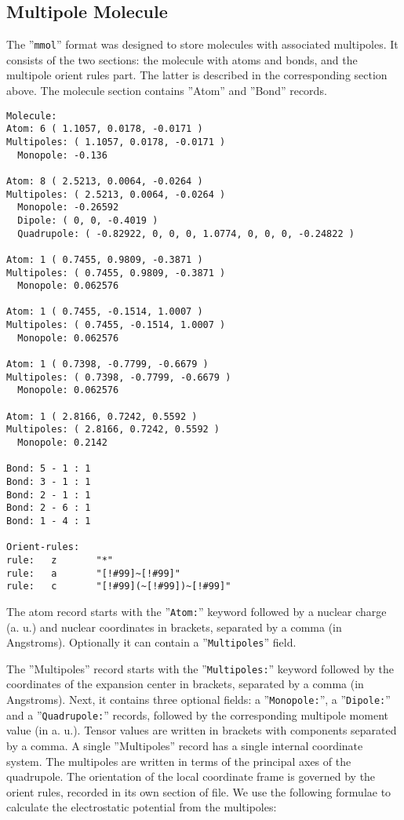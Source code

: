 \documentclass[10pt,a4paper]{article}
\begin{document}
\subsection{Multipole Molecule}
The ''\lstinline{mmol}'' format was designed to store molecules with associated multipoles. 
It consists of the two sections: the molecule with atoms and bonds, and the multipole 
orient rules part.
The latter is described in the corresponding section above. The molecule section contains
''Atom'' and ''Bond'' records.
\begin{lstlisting}[style=file]
Molecule:
Atom: 6 ( 1.1057, 0.0178, -0.0171 )
Multipoles: ( 1.1057, 0.0178, -0.0171 )
  Monopole: -0.136

Atom: 8 ( 2.5213, 0.0064, -0.0264 )
Multipoles: ( 2.5213, 0.0064, -0.0264 )
  Monopole: -0.26592
  Dipole: ( 0, 0, -0.4019 )
  Quadrupole: ( -0.82922, 0, 0, 0, 1.0774, 0, 0, 0, -0.24822 )

Atom: 1 ( 0.7455, 0.9809, -0.3871 )
Multipoles: ( 0.7455, 0.9809, -0.3871 )
  Monopole: 0.062576

Atom: 1 ( 0.7455, -0.1514, 1.0007 )
Multipoles: ( 0.7455, -0.1514, 1.0007 )
  Monopole: 0.062576

Atom: 1 ( 0.7398, -0.7799, -0.6679 )
Multipoles: ( 0.7398, -0.7799, -0.6679 )
  Monopole: 0.062576

Atom: 1 ( 2.8166, 0.7242, 0.5592 )
Multipoles: ( 2.8166, 0.7242, 0.5592 )
  Monopole: 0.2142

Bond: 5 - 1 : 1
Bond: 3 - 1 : 1
Bond: 2 - 1 : 1
Bond: 2 - 6 : 1
Bond: 1 - 4 : 1

Orient-rules:
rule:   z       "*"
rule:   a       "[!#99]~[!#99]"
rule:   c       "[!#99](~[!#99])~[!#99]"
\end{lstlisting} 
The atom record starts with the ''\lstinline{Atom:}'' keyword followed by a nuclear charge 
(a. u.) and nuclear coordinates in brackets, separated by a comma (in Angstroms). 
Optionally it can contain a ''\lstinline{Multipoles}'' field.

The ''Multipoles'' record starts with the ''\lstinline{Multipoles:}'' keyword followed 
by the coordinates of the expansion center
in brackets, separated by a comma (in Angstroms). Next, it contains 
three optional fields: a ''\lstinline{Monopole:}'', a ''\lstinline{Dipole:}'' and a
''\lstinline{Quadrupole:}'' records, followed by the corresponding multipole moment 
value (in a. u.). Tensor values are written in brackets with components separated by 
a comma. A single ''Multipoles'' record has a single internal coordinate system. 
The multipoles are written in terms of the principal axes of the quadrupole. 
The orientation of the local coordinate frame is governed by the orient rules,
recorded in its own section of file. We use the following formulae to calculate the
electrostatic potential from the multipoles:
\end{document}
